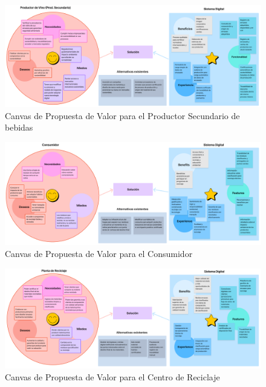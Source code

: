 \begin{figure}[!htb]
    \centering
    \includegraphics[width=\textwidth]{Figures/value-proposition-canvas-secondary-producer.png}
    \caption{Canvas de Propuesta de Valor para el Productor Secundario de bebidas}
    \label{fig:value-proposition-canvas-secondary-producer}
\end{figure}

\begin{figure}[!htb]
    \centering
    \includegraphics[width=\textwidth]{Figures/value-proposition-canvas-consumer.png}
    \caption{Canvas de Propuesta de Valor para el Consumidor}
    \label{fig:value-proposition-canvas-consumer}
\end{figure}

\begin{figure}[!htb]
    \centering
    \includegraphics[width=\textwidth]{Figures/value-proposition-canvas-recycler.png}
    \caption{Canvas de Propuesta de Valor para el Centro de Reciclaje}
    \label{fig:value-proposition-canvas-recycler}
\end{figure}

